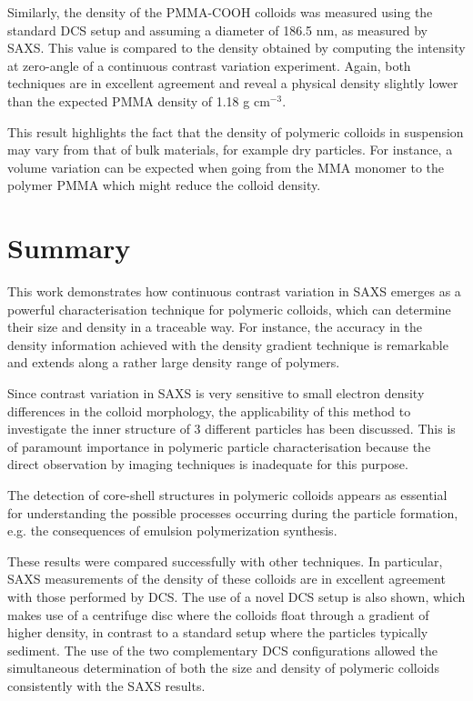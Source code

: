 Similarly, the density of the PMMA-COOH colloids was measured using the standard DCS setup and assuming a diameter of 186.5 nm, as measured by SAXS. This value is compared to the density obtained by computing the intensity at zero-angle of a continuous contrast variation experiment. Again, both techniques are in excellent agreement and reveal a physical density slightly lower than the expected PMMA density of 1.18 g cm$^{-3}$\citep{dingenouts_analysis_1999}.

This result highlights the fact that the density of polymeric colloids in suspension may vary from that of bulk materials, for example dry particles. For instance, a volume variation can be expected when going from the MMA monomer to the polymer PMMA\citep{nichols_prediction_1950} which might reduce the colloid density.

\section{Summary}
This work demonstrates how continuous contrast variation in SAXS emerges as a powerful characterisation technique for polymeric colloids, which can determine their size and density in a traceable way. For instance, the accuracy in the density information achieved with the density gradient technique is remarkable and extends along a rather large density range of polymers.

Since contrast variation in SAXS is very sensitive to small electron density differences in the colloid morphology, the applicability of this method to investigate the inner structure of 3 different particles has been discussed. This is of paramount importance in polymeric particle characterisation because the direct observation by imaging techniques is inadequate for this purpose.

The detection of core-shell structures in polymeric colloids appears as essential for understanding the possible processes occurring during the particle formation, e.g. the consequences of emulsion polymerization synthesis. 

These results were compared successfully with other techniques. In particular, SAXS measurements of the density of these colloids are in excellent agreement with those performed by DCS. The use of a novel DCS setup is also shown, which makes use of a centrifuge disc where the colloids float through a gradient of higher density, in contrast to a standard setup where the particles typically sediment. The use of the two complementary DCS configurations allowed the simultaneous determination of both the size and density of polymeric colloids consistently with the SAXS results.


